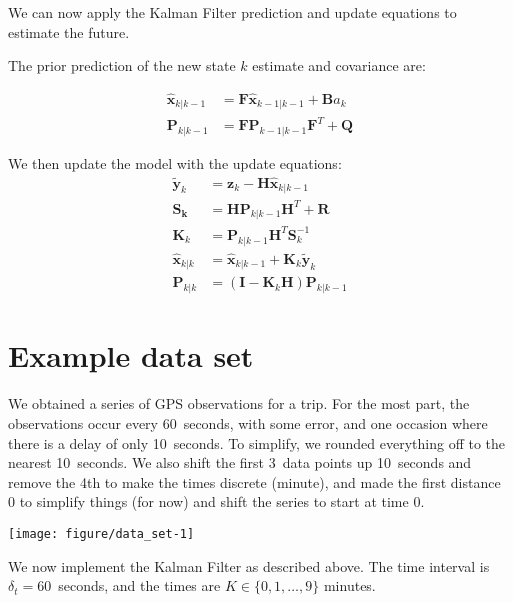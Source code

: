 \documentclass[11pt]{article}\usepackage[]{graphicx}\usepackage[]{color}
\newenvironment{knitrout}{}{} %
\begin{document}
We can now apply the Kalman Filter prediction and update equations to estimate the future.

The prior prediction of the new state $k$ estimate and covariance are:

\begin{align}
  \mathbf{\hat x}_{k|k-1} &= \mathbf{F} \mathbf{\hat x}_{k-1|k-1} + \mathbf{B} a_k \\
  \mathbf{P}_{k|k-1} &= \mathbf{F}\mathbf{P}_{k-1|k-1}\mathbf{F}^T + \mathbf{Q}
\end{align}


We then update the model with the update equations:
\begin{align}
  \mathbf{\tilde y}_k &= \mathbf{z}_k - \mathbf{H} \mathbf{\hat x}_{k|k-1} \\
  \mathbf{S_k} &= \mathbf{H} \mathbf{P}_{k|k-1} \mathbf{H}^T + \mathbf{R} \\
  \mathbf{K}_k &= \mathbf{P}_{k|k-1} \mathbf{H}^T \mathbf{S}_k^{-1} \\
  \mathbf{\hat x}_{k|k} &= \mathbf{\hat x}_{k|k-1} + \mathbf{K}_k \mathbf{\tilde y}_k \\
  \mathbf{P}_{k|k} &= \left(\mathbf{I} - \mathbf{K}_k \mathbf{H}\right) \mathbf{P}_{k|k-1}
\end{align}






\section{Example data set}

We obtained a series of GPS observations for a trip.
For the most part, the observations occur every 60~seconds, with some error, and one
occasion where there is a delay of only 10~seconds.
To simplify, we rounded everything off to the nearest 10~seconds.
We also shift the first 3~data points up 10~seconds and remove the 4th to make the times discrete (minute),
and made the first distance 0 to simplify things (for now) and shift the series to start at time 0.
\begin{knitrout}
\color{fgcolor}

{\centering \texttt{[image: figure/data\_set-1]} 

}



\end{knitrout}


We now implement the Kalman Filter as described above.
The time interval is $\delta_t = 60$~seconds, and the times are $K \in \{0,1,\ldots,9\}$ minutes.
\end{document}
